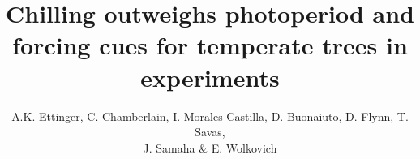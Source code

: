 \documentclass{article}
\begin{document}
% 

\title{Chilling outweighs photoperiod and forcing cues for temperate trees in experiments} 

\author{A.K. Ettinger, C. Chamberlain, I. Morales-Castilla, D. Buonaiuto, D. Flynn, T. Savas, \\J. Samaha \& E. Wolkovich}
\maketitle %



\end{document}
